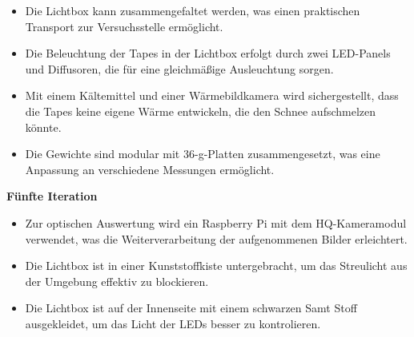 \begin{itemize}
    \item Die Lichtbox kann zusammengefaltet werden, was einen praktischen Transport zur Versuchsstelle ermöglicht.
    \item Die Beleuchtung der Tapes in der Lichtbox erfolgt durch zwei LED-Panels und Diffusoren, die für eine gleichmäßige Ausleuchtung sorgen.
    \item Mit einem Kältemittel und einer Wärmebildkamera wird sichergestellt, dass die Tapes keine eigene Wärme entwickeln, die den Schnee aufschmelzen könnte.
    \item Die Gewichte sind modular mit 36-g-Platten zusammengesetzt, was eine Anpassung an verschiedene Messungen ermöglicht.
\end{itemize}

\textbf{Fünfte Iteration}

\begin{itemize}
    \item Zur optischen Auswertung wird ein Raspberry Pi mit dem HQ-Kameramodul verwendet, was die Weiterverarbeitung der aufgenommenen Bilder erleichtert.
    \item Die Lichtbox ist in einer Kunststoffkiste untergebracht, um das Streulicht aus der Umgebung effektiv zu blockieren.
      \item Die Lichtbox ist auf der Innenseite mit einem schwarzen Samt Stoff ausgekleidet, um das Licht der LEDs besser zu kontrolieren.
\end{itemize}
